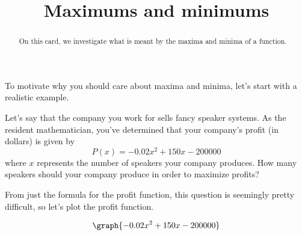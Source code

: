 \documentclass{ximera}
\title[Dig-In]{Maximums and minimums}
\begin{document}
\begin{abstract}
On this card, we investigate what is meant by the maxima and minima of a function.  
\end{abstract}
\maketitle

To motivate why you should care about maxima and minima, let's start with a realistic example. 

\begin{example}
Let's say that the company you work for sells fancy speaker systems.  As the resident mathematician, you've determined that your company's profit (in dollars) is given by 
\[ P(x) = -0.02x^2+150x-200000 \]
where $x$ represents the number of speakers your company produces.  How many speakers should your company produce in order to maximize profits? 
\begin{explanation}
From just the formula for the profit function, this question is seemingly pretty difficult, so let's plot the profit function. 

\[ \graph{-0.02x^2+150x-200000} \]
\end{explanation}
\end{example}
\end{document}
